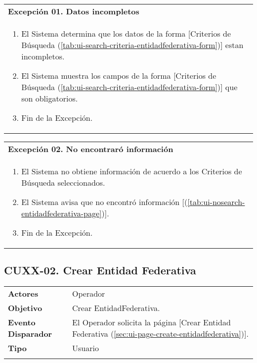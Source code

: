 \begin{tabular}{ p{15.5cm} }
	\textbf{Excepción 01. Datos incompletos} \\
	\begin{enumerate}
		\item El Sistema determina que los datos de la forma [Criterios de Búsqueda (\ref{tab:ui-search-criteria-entidadfederativa-form})] estan incompletos.
		\item El Sistema muestra los campos de la forma [Criterios de Búsqueda (\ref{tab:ui-search-criteria-entidadfederativa-form})] que son obligatorios.
		\item Fin de la Excepción.
	\end{enumerate}
\end{tabular}

\begin{tabular}{ p{15.5cm} }
	\textbf{Excepción 02. No encontraró información} \\
	\begin{enumerate}
		\item El Sistema no obtiene información de acuerdo a los Criterios de Búsqueda seleccionados.
		\item El Sistema avisa que no encontró información [(\ref{tab:ui-nosearch-entidadfederativa-page})].
		\item Fin de la Excepción.
	\end{enumerate}
\end{tabular}


\clearpage
\subsection{CUXX-02. Crear Entidad Federativa} \label{sec:cu-create-EntidadFederativa}

\begin{tabular}{ p{3.5cm} p{11.5cm} }
	\textbf{Actores} & Operador\\
	\textbf{Objetivo} & Crear EntidadFederativa.\\
	\textbf{Evento Disparador} & El Operador solicita la página [Crear Entidad Federativa (\ref{sec:ui-page-create-entidadfederativa})].\\
	\textbf{Tipo} & Usuario\\
	\\
\end{tabular}

